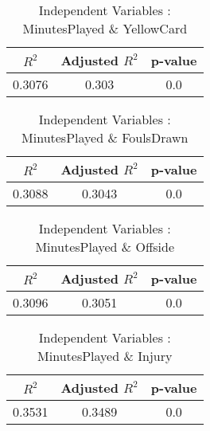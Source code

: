 \documentclass[12pt]{article}
\begin{document}
\hfill
\begin{minipage}{0.4\textwidth}
	\begin{table}[H]
		\centering
		\caption{Independent Variables : MinutesPlayed \& YellowCard}\label{table:1a}
		{\begin{tabular}{|c|c|c|}
				\hline
				$ R^2 $ & Adjusted $ R^2 $ & p-value \\
				\hline
				0.3076 & 0.303 & 0.0 \\
				\hline
			\end{tabular}
		}
	\end{table}
\end{minipage}
\hfill
\begin{minipage}{0.4\textwidth}
	\begin{table}[H]
		\centering
		\caption{Independent Variables : MinutesPlayed \& FoulsDrawn}\label{table:1a}
		{\begin{tabular}{|c|c|c|}
				\hline
				$ R^2 $ & Adjusted $ R^2 $ & p-value \\
				\hline
				0.3088 & 0.3043 & 0.0 \\
				\hline
			\end{tabular}
		}
	\end{table}
\end{minipage}
\hfill
\begin{minipage}{0.4\textwidth}
	\begin{table}[H]
		\centering
		\caption{Independent Variables : MinutesPlayed \& Offside}\label{table:1a}
		{\begin{tabular}{|c|c|c|}
				\hline
				$ R^2 $ & Adjusted $ R^2 $ & p-value \\
				\hline
				0.3096 & 0.3051 & 0.0 \\
				\hline
			\end{tabular}
		}
	\end{table}
\end{minipage}
\hfill
\begin{minipage}{0.4\textwidth}
	\begin{table}[H]
		\centering
		\caption{Independent Variables : MinutesPlayed \& Injury}\label{table:1a}
		{\begin{tabular}{|c|c|c|}
				\hline
				$ R^2 $ & Adjusted $ R^2 $ & p-value \\
				\hline
				0.3531 & 0.3489 & 0.0 \\
				\hline
			\end{tabular}
		}
	\end{table}
\end{minipage}
\end{document}
